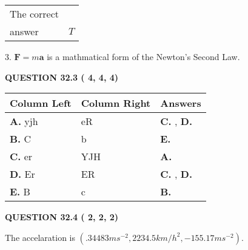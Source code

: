 \documentclass[12pt]{article}
\begin{document}
\noindent\begin{tabular}{|l|l|}\hline The correct & \\
          answer &  %
$T$ \\ \hline \end{tabular}
3.  %
$\mathbf{F}=m\mathbf{a}$ is a mathmatical form of  %
the Newton's Second Law.
 
 
 
  
\vspace{0.2in}
  
{\textbf{\Large{QUESTION
32.3 
 (          4,          4,          4)
}}}
  
  
 
 
\noindent{}
  
  
\begin{tabular}{|l|l|l|}
 \hline
 Column Left & Column Right  & Answers       \\ 
 \hline
{\textbf{\large{
A.}}}
yjh
  & 
eR
 & 
{\textbf{\large{
C.}}}
, 
{\textbf{\large{
D.}}}
 \\ 
 \hline
{\textbf{\large{
B.}}}
C
  & 
b
 & 
{\textbf{\large{
E.}}}
 \\ 
 \hline
{\textbf{\large{
C.}}}
er
  & 
YJH
 & 
{\textbf{\large{
A.}}}
 \\ 
 \hline
{\textbf{\large{
D.}}}
Er
  & 
ER
 & 
{\textbf{\large{
C.}}}
, 
{\textbf{\large{
D.}}}
 \\ 
 \hline
{\textbf{\large{
E.}}}
B
  & 
c
 & 
{\textbf{\large{
B.}}}
 \\ 
 \hline
 \end{tabular}
  
  
 
 
 
 
  
\vspace{0.2in}
  
{\textbf{\Large{QUESTION
32.4 
 (          2,          2,          2)
}}}
  
  
 
 
\noindent{}
 
 
The accelaration is
$(
.34483ms^{-2},
2234.5km/h^2,
-155.17ms^{-2}
).
$
 
 
 
 
 
 
\noindent{}
\end{document}
